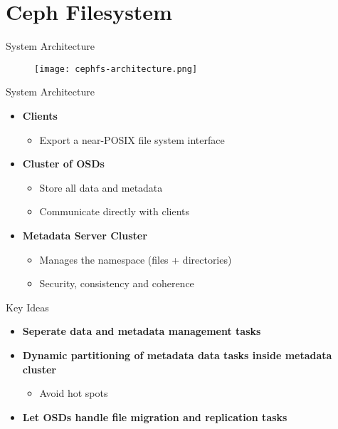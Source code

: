 \section{Ceph Filesystem}


\begin{frame}{System Architecture}
    \begin{figure}[htpb]
        \centering
        \texttt{[image: cephfs-architecture.png]}
    \end{figure}
\end{frame}

\begin{frame}{System Architecture}
    \begin{itemize}
        \item \textbf{Clients}
            \begin{itemize}
                \item Export a near-POSIX file system interface
            \end{itemize}
        \item \textbf{Cluster of OSDs}
            \begin{itemize}
                \item Store all data and metadata
                \item Communicate directly with clients
            \end{itemize}
        \item \textbf{Metadata Server Cluster}
            \begin{itemize}
                \item Manages the namespace (files + directories)
                \item Security, consistency and coherence
            \end{itemize}
    \end{itemize}
\end{frame}

\begin{frame}{Key Ideas}
    \begin{itemize}
        \item \textbf{Seperate data and metadata management tasks}
        \item \textbf{Dynamic partitioning of metadata data tasks inside metadata cluster}
            \begin{itemize}
                \item Avoid hot spots
            \end{itemize}
        \item \textbf{Let OSDs handle file migration and replication tasks}
    \end{itemize}
\end{frame}

